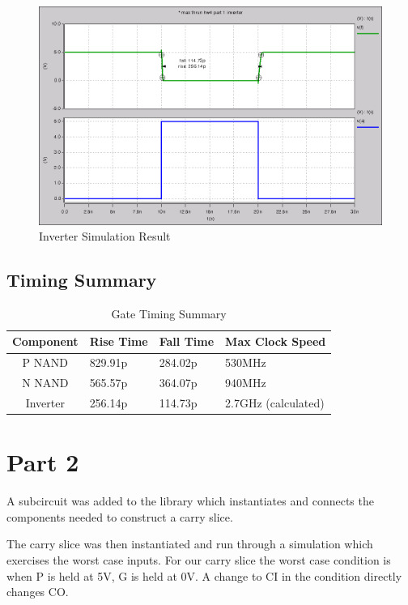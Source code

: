 \documentclass{article}
\begin{document}
\begin{figure}[H]
    \centering
    \includegraphics[width=\linewidth]{../part_1_inv.png}
    \caption{Inverter Simulation Result}
\end{figure}

\subsection*{Timing Summary}

\begin{table}[H]
    \centering
    \begin{tabular}{clll}
        \toprule
        \textbf{Component} & \textbf{Rise Time} & \textbf{Fall Time} & \textbf{Max Clock Speed} \\
        \midrule
        P NAND & 829.91p & 284.02p & 530MHz \\
        N NAND &  565.57p & 364.07p & 940MHz \\
      Inverter & 256.14p & 114.73p & 2.7GHz (calculated) \\
        \bottomrule
    \end{tabular}
    \caption{Gate Timing Summary}
\end{table}

\newpage
\section*{Part 2}

A subcircuit was added to the library which instantiates and connects the
components needed to construct a carry slice.



The carry slice was then instantiated and run through a simulation which
exercises the worst case inputs. For our carry slice the worst case condition
is when P is held at 5V, G is held at 0V. A change to CI in the condition
directly changes CO.
\end{document}
